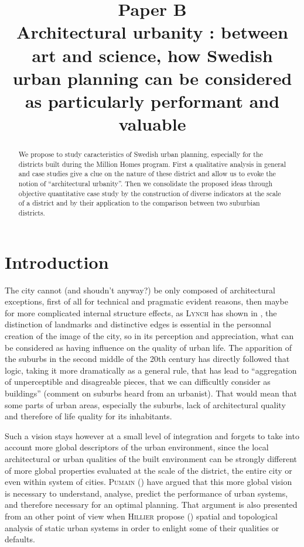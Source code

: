\documentclass[english]{article}
\date{}
\newcommand{\noun}[1]{\textsc{#1}}
\begin{document}
\title{Paper B\\
Architectural urbanity : between art and science, how Swedish urban
planning can be considered as particularly performant and valuable}

\maketitle
\vspace{3cm}

\begin{abstract}
We propose to study caracteristics of Swedish urban planning, especially
for the districts built during the Million Homes program. First a
qualitative analysis in general and case studies give a clue on the
nature of these district and allow us to evoke the notion of ``architectural
urbanity''. Then we consolidate the proposed ideas through objective
quantitative case study by the construction of diverse indicators
at the scale of a district and by their application to the comparison
between two suburbian districts.

\newpage{}
\end{abstract}

\section*{Introduction}

The city cannot (and shoudn't anyway?) be only composed of architectural
exceptions, first of all for technical and pragmatic evident reasons,
then maybe for more complicated internal structure effects, as \noun{Lynch}
has shown in \cite{Lyn60}, the distinction of landmarks and distinctive
edges is essential in the personnal creation of the image of the city,
so in its perception and appreciation, what can be considered as having
influence on the quality of urban life. The apparition of the suburbs
in the second middle of the 20th century has directly followed that
logic, taking it more dramatically as a general rule, that has lead
to ``aggregation of unperceptible and disagreable pieces, that we
can difficultly consider as buildings'' (comment on suburbs heard
from an urbanist). That would mean that some parts of urban areas,
especially the suburbs, lack of architectural quality and therefore
of life quality for its inhabitants.

\bigskip{}


Such a vision stays however at a small level of integration and forgets
to take into account more global descriptors of the urban environment,
since the local architectural or urban qualities of the built environment
can be strongly different of more global properties evaluated at the
scale of the district, the entire city or even within system of cities.
\noun{Pumain} (\cite{pumain1997pour}) have argued that this more
global vision is necessary to understand, analyse, predict the performance
of urban systems, and therefore necessary for an optimal planning.
That argument is also presented from an other point of view when \noun{Hillier}
propose (\cite{hillier1976space}) spatial and topological analysis
of static urban systems in order to enlight some of their qualities
or defaults.
\end{document}
